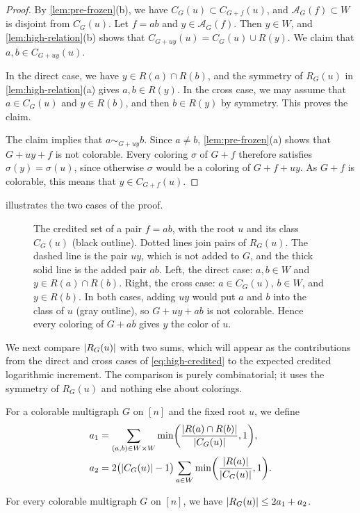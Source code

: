 \begin{proof}
By \cref{lem:pre-frozen}(b), we have $C_G(u) \subset C_{G + f}(u)$, and $\mathscr{A}_G(f) \subset W$ is disjoint from $C_G(u)$. Let $f = ab$ and $y \in \mathscr{A}_G(f)$. Then $y \in W$, and \cref{lem:high-relation}(b) shows that $C_{G + uy}(u) = C_G(u) \cup R(y)$. We claim that $a, b \in C_{G + uy}(u)$.

In the direct case, we have $y \in R(a) \cap R(b)$, and the symmetry of $R_G(u)$ in \cref{lem:high-relation}(a) gives $a, b \in R(y)$. In the cross case, we may assume that $a \in C_G(u)$ and $y \in R(b)$, and then $b \in R(y)$ by symmetry. This proves the claim.

The claim implies that $a \sim_{G + uy} b$. Since $a \ne b$, \cref{lem:pre-frozen}(a) shows that $G + uy + f$ is not colorable. Every coloring $\sigma$ of $G + f$ therefore satisfies $\sigma(y) = \sigma(u)$, since otherwise $\sigma$ would be a coloring of $G + f + uy$. As $G + f$ is colorable, this means that $y \in C_{G + f}(u)$.
\end{proof}

 illustrates the two cases of the proof.

\begin{figure}[ht]
\centering

\caption{The credited set of a pair $f = ab$, with the root $u$ and its class $C_G(u)$ (black outline). Dotted lines join pairs of $R_G(u)$. The dashed line is the pair $uy$, which is not added to $G$, and the thick solid line is the added pair $ab$. Left, the direct case: $a, b \in W$ and $y \in R(a) \cap R(b)$. Right, the cross case: $a \in C_G(u)$, $b \in W$, and $y \in R(b)$. In both cases, adding $uy$ would put $a$ and $b$ into the class of $u$ (gray outline), so $G + uy + ab$ is not colorable. Hence every coloring of $G + ab$ gives $y$ the color of $u$.}
\label{fig:high-absorb}
\end{figure}

We next compare $\left|R_G(u)\right|$ with two sums, which will appear as the contributions from the direct and cross cases of \eqref{eq:high-credited} to the expected credited logarithmic increment. The comparison is purely combinatorial; it uses the symmetry of $R_G(u)$ and nothing else about colorings.

For a colorable multigraph $G$ on $[n]$ and the fixed root $u$, we define
\begin{equation}\label{eq:high-ain-acr}
\begin{split}
a_1 &= \sum_{(a, b) \in W \times W} \min \biggl( \frac{\left|R(a) \cap R(b)\right|}{\left|C_G(u)\right|}, 1 \biggr), \\
a_2 &= 2 \bigl( \left|C_G(u)\right| - 1 \bigr) \sum_{a \in W} \min \biggl( \frac{\left|R(a)\right|}{\left|C_G(u)\right|}, 1 \biggr).
\end{split}
\end{equation}
\begin{lemma}\label{lem:high-comb}
For every colorable multigraph $G$ on $[n]$, we have $\left|R_G(u)\right| \le 2 a_1 + a_2$.
\end{lemma}

